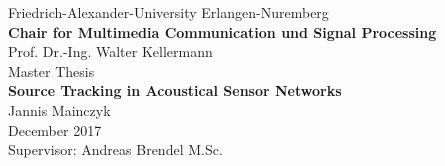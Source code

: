 \begin{titlepage}
\begin{center}
\vspace*{-1cm}
 {\LARGE Friedrich-Alexander-University Erlangen-Nuremberg}\\
\vspace{1cm}
 {\Large \textbf{Chair for Multimedia Communication und Signal Processing}}\\
\vspace{1cm}
 {\Large Prof. Dr.-Ing. Walter Kellermann}\\
\vspace{3cm}
 {\LARGE Master Thesis}\\
\vspace{2cm}
 {\LARGE \textbf{Source Tracking in Acoustical Sensor Networks}}\\
\vspace{2cm}
{\LARGE Jannis Mainczyk}\\
\vspace{3cm}
{\Large December 2017}\\
\vspace{1cm}
{\Large Supervisor: Andreas Brendel M.Sc.}
\end{center}
\end{titlepage}